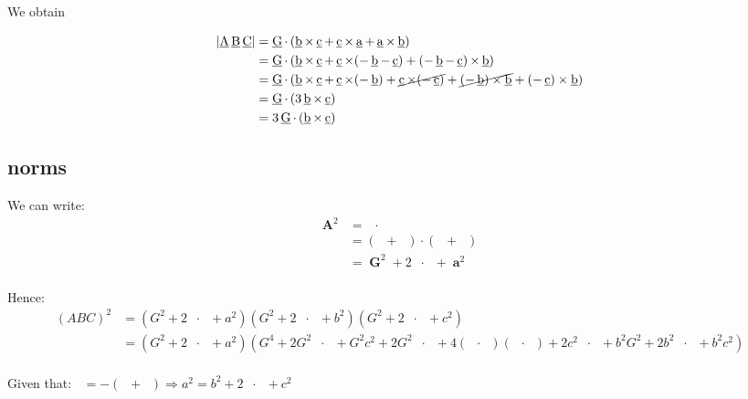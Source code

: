 \documentclass[10pt,a4paper]{article}
\newcommand{\ud}[1]{\underline{#1}}
\DeclareMathOperator{\tm}{\times}
\DeclareMathOperator{\A}{\ud{A}}
\DeclareMathOperator{\B}{\ud{B}}
\DeclareMathOperator{\C}{\ud{C}}
\DeclareMathOperator{\G}{\ud{G}}
\DeclareMathOperator{\av}{\ud{a}}
\DeclareMathOperator{\bv}{\ud{b}}
\DeclareMathOperator{\cv}{\ud{c}}
\DeclareMathOperator{\An}{\mathbf{A}}
\DeclareMathOperator{\Gn}{\mathbf{G}}
\DeclareMathOperator{\an}{\mathbf{a}}
\begin{document}
We obtain

\begin{align}
\left| \A \B \C \right|
& = \G \cdot \left(\bv \tm \cv + \cv \tm \av + \av \tm \bv \right) \nonumber \\
& = \G \cdot \left(\bv \tm \cv + \cv \tm (-\bv-\cv)	+ (-\bv-\cv) \tm \bv \right) \nonumber \\
& = \G \cdot \left(\bv \times \cv + \cv \times (-\bv) + \cancel{\cv \times (-\cv)}
	+ \cancel{(-\bv) \times \bv} + (- \cv) \times \bv \right) \nonumber \\
& = \G \cdot \left(3 \bv \times \cv \right) \nonumber \\
& = 3 \G \cdot \left( \bv \times \cv \right)
\end{align}


\subsection{norms}

We can write:
$$
\begin{array}{ll}
    \An^2
    & = \A \cdot \A\\
    & = (\G + \av) \cdot (\G + \av)\\
    & = \Gn^2 + 2\G \cdot \av + \an ^2\\
\end{array}
$$

Hence:
$$
\begin{array}{ll}
    (ABC)^2
    & = (G^2 + 2\G \cdot \av + a^2)
    (G^2 + 2\G \cdot \bv + b^2)
    (G^2 + 2\G \cdot \cv + c^2)\\
    & = (G^2 + 2\G \cdot \av + a^2)
    (G^4 + 2G^2\G \cdot \cv + G^2c^2
     + 2G^2\G \cdot \bv + 4(\G \cdot \bv)(\G \cdot \cv) + 2c^2\G \cdot \bv
     + b^2G^2 + 2b^2\G \cdot \cv + b^2c^2)\\
\end{array}
$$

Given that: $\av = -(\bv+\cv) \Rightarrow a^2=b^2 + 2\bv \cdot \cv + c^2$
\end{document}
